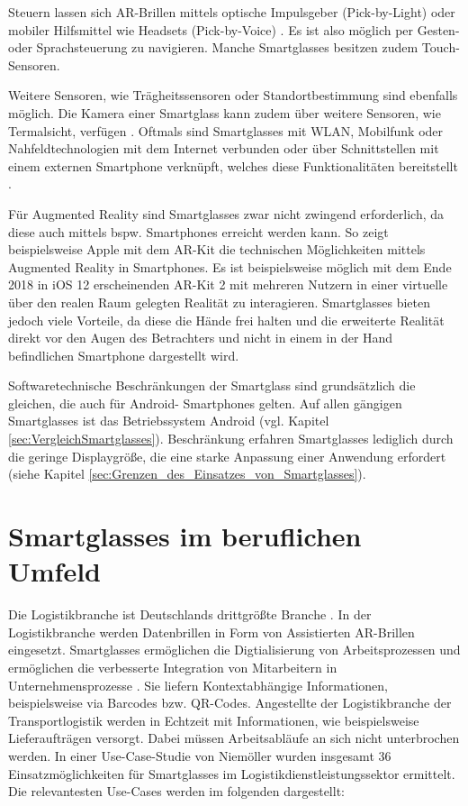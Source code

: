 Steuern lassen sich AR-Brillen mittels optische Impulsgeber (Pick-by-Light) oder mobiler Hilfsmittel wie Headsets (Pick-by-Voice) \cite{INTRALOGISTIK2016}. Es ist also möglich per Gesten- oder Sprachsteuerung zu navigieren. Manche Smartglasses besitzen zudem Touch-Sensoren.

Weitere Sensoren, wie Trägheitssensoren oder Standortbestimmung sind ebenfalls möglich. Die Kamera einer Smartglass kann zudem über weitere Sensoren, wie Termalsicht, verfügen \cite[S.~27]{Schwenke2016}. Oftmals sind Smartglasses mit WLAN, Mobilfunk oder Nahfeldtechnologien mit dem Internet verbunden oder über Schnittstellen mit einem externen Smartphone verknüpft, welches diese Funktionalitäten bereitstellt \cite[S.~28]{Schwenke2016}.

Für Augmented Reality sind Smartglasses zwar nicht zwingend erforderlich, da diese auch mittels bspw. Smartphones erreicht werden kann. So zeigt beispielsweise Apple mit dem AR-Kit \cite{Apple2018} die technischen Möglichkeiten mittels Augmented Reality in Smartphones. Es ist beispielsweise möglich mit dem Ende 2018 in iOS 12 erscheinenden AR-Kit 2 mit mehreren Nutzern in einer virtuelle über den realen Raum gelegten Realität zu interagieren. Smartglasses bieten jedoch viele Vorteile, da diese die Hände frei halten und die erweiterte Realität direkt vor den Augen des Betrachters und nicht in einem in der Hand befindlichen Smartphone dargestellt wird.

Softwaretechnische Beschränkungen der Smartglass sind grundsätzlich die gleichen, die auch für Android- Smartphones gelten. Auf allen gängigen Smartglasses ist das Betriebssystem Android (vgl. Kapitel \ref{sec:VergleichSmartglasses}). Beschränkung erfahren Smartglasses lediglich durch die geringe Displaygröße, die eine starke Anpassung einer Anwendung erfordert (siehe Kapitel \ref{sec:Grenzen_des_Einsatzes_von_Smartglasses}).
%
%
%
%
%
%
\section{Smartglasses im beruflichen Umfeld}
\label{sec:Smartglasses_im beruflichen_Umfeld}
Die Logistikbranche ist Deutschlands drittgrößte Branche \cite{Zobel2016}. In der Logistikbranche werden Datenbrillen in Form von Assistierten AR-Brillen eingesetzt. Smartglasses ermöglichen die Digtialisierung von Arbeitsprozessen und ermöglichen die verbesserte Integration von Mitarbeitern in Unternehmensprozesse \cite{Zobel2016}. Sie liefern Kontextabhängige Informationen, beispielsweise via Barcodes bzw. QR-Codes. Angestellte der Logistikbranche der Transportlogistik werden in Echtzeit mit Informationen, wie beispielsweise Lieferaufträgen versorgt. Dabei müssen Arbeitsabläufe an sich nicht unterbrochen werden. In einer Use-Case-Studie von Niemöller \cite{Niemoller2017} wurden insgesamt 36 Einsatzmöglichkeiten für Smartglasses im Logistikdienstleistungssektor ermittelt. Die relevantesten Use-Cases werden im folgenden dargestellt:

